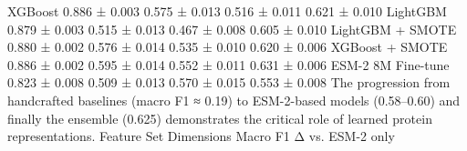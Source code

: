 {}\markdownRendererPipe{} XGBoost \markdownRendererPipe{} 0.886 ± 0.003 \markdownRendererPipe{} 0.575 ± 0.013 \markdownRendererPipe{} 0.516 ± 0.011 \markdownRendererPipe{} 0.621 ± 0.010 \markdownRendererPipe{}\markdownRendererSoftLineBreak
{}\markdownRendererPipe{} LightGBM \markdownRendererPipe{} 0.879 ± 0.003 \markdownRendererPipe{} 0.515 ± 0.013 \markdownRendererPipe{} 0.467 ± 0.008 \markdownRendererPipe{} 0.605 ± 0.010 \markdownRendererPipe{}\markdownRendererSoftLineBreak
{}\markdownRendererPipe{} LightGBM + SMOTE \markdownRendererPipe{} 0.880 ± 0.002 \markdownRendererPipe{} 0.576 ± 0.014 \markdownRendererPipe{} 0.535 ± 0.010 \markdownRendererPipe{} 0.620 ± 0.006 \markdownRendererPipe{}\markdownRendererSoftLineBreak
{}\markdownRendererPipe{} XGBoost + SMOTE \markdownRendererPipe{} 0.886 ± 0.002 \markdownRendererPipe{} 0.595 ± 0.014 \markdownRendererPipe{} 0.552 ± 0.011 \markdownRendererPipe{} 0.631 ± 0.006 \markdownRendererPipe{}\markdownRendererSoftLineBreak
{}\markdownRendererPipe{} ESM-2 8M Fine-tune \markdownRendererPipe{} 0.823 ± 0.008 \markdownRendererPipe{} 0.509 ± 0.013 \markdownRendererPipe{} 0.570 ± 0.015 \markdownRendererPipe{} 0.553 ± 0.008 \markdownRendererPipe{}\markdownRendererSoftLineBreak
{}\markdownRendererPipe{}  \markdownRendererPipe{}  \markdownRendererPipe{}  \markdownRendererPipe{}  \markdownRendererPipe{}  \markdownRendererPipe{}\markdownRendererParagraphSeparator
{}\markdownRendererParagraphSeparator
{}The progression from handcrafted baselines (macro F1 ≈ 0.19) to ESM-2-based models (0.58–0.60)\markdownRendererSoftLineBreak
{}and finally the ensemble (0.625) demonstrates the critical role of learned protein\markdownRendererSoftLineBreak
{}representations.\markdownRendererInterblockSeparator
{}
\markdownRendererSectionEnd \markdownRendererSectionBegin
{}\markdownRendererInterblockSeparator
{}\markdownRendererPipe{} Feature Set \markdownRendererPipe{} Dimensions \markdownRendererPipe{} Macro F1 \markdownRendererPipe{} Δ vs. ESM-2 only \markdownRendererPipe{}\markdownRendererSoftLineBreak
